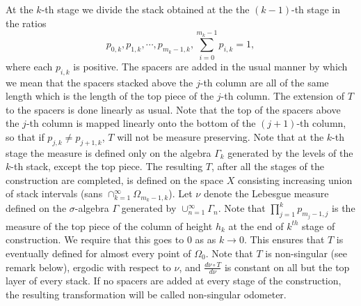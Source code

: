 \documentclass{amsart}
\theoremstyle{definition}
\theoremstyle{remark}
\numberwithin{equation}{section}
\newcommand{\1}{\mathbb{1}}
\begin{document}
 At the $k$-th stage we divide the stack obtained at the the $(k-1)$-th stage
in the ratios
$$p_{0,k}, p_{1,k}, \cdots, p_{m_k-1, k}, \sum_{i=0}^{m_k-1}p_{i,k} =1, $$
where each $p_{i,k}$ is positive. The spacers are added in the usual manner by which we mean that the spacers stacked above the $j$-th column are all of the same length which is the length of the top piece of the $j$-th column. The extension of $T$ to the spacers is done linearly as usual. Note that the top of the spacers above the $j$-th column is mapped linearly onto the bottom of the $(j+1)$-th
column, so that if $p_{j,k} \neq p_{{j+1},k}$, $T$ will not be measure preserving. Note that
at the $k$-th stage the measure is defined only on the algebra ${\Gamma }_k$ generated by the levels of the $k$-th stack, except the top piece. The resulting $T$, after all the stages of the construction are completed, is defined on the space $X$ consisting increasing union of stack intervals (sans $\cap_{k=1}^\infty \Omega_{m_k-1,k}$). Let $\nu$ denote the  Lebesgue measure defined on the $\sigma$-algebra  $\Gamma $ generated by $\cup_{n=1}^\infty{\Gamma}_n$. Note that $\prod_{j=1}^k p_{m_j-1,j}$ is the measure of the top piece of the column of height $h_k$ at the end of $k^{th}$ stage of construction. We require that this goes to 0 as as $k\rightarrow 0$. This ensures that $T$ is eventually defined for almost every point of $\Omega_0$.   Note that $T$ is non-singular (see remark below), ergodic with respect to $\nu$, and $\frac{d\nu\circ T}{d\nu}$ is constant on all but the top layer of every stack. If no spacers are added at every stage of the construction, the resulting transformation will be called non-singular odometer. \\
\end{document}

